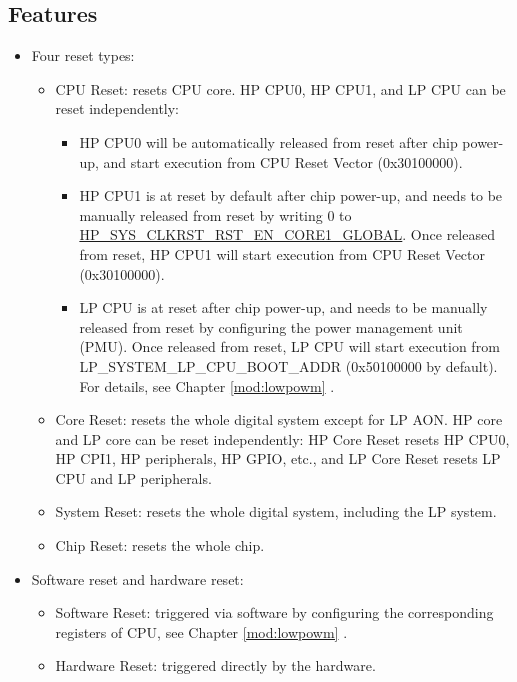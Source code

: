\documentclass[main\_\_EN.tex]{subfiles}
\begin{document}
\subsection{Features}
\label{sec:resclk-features}
\begin{itemize}
    \item Four reset types:
    \begin{itemize}
    \item CPU Reset: resets CPU core. HP CPU0, HP CPU1, and LP CPU can be reset independently:
    \begin{itemize}
            \item HP CPU0 will be automatically released from reset after chip power-up, and start execution from CPU Reset Vector (0x30100000).
            \item HP CPU1 is at reset by default after chip power-up, and needs to be manually released from reset by writing 0 to \hyperref[fielddesc:HPSYSCLKRSTRSTENCORE1GLOBAL]{HP\_SYS\_CLKRST\_RST\_EN\_CORE1\_GLOBAL}. Once released from reset, HP CPU1 will start execution from CPU Reset Vector (0x30100000).
            \item LP CPU is at reset after chip power-up, and needs to be manually released from reset by configuring the power management unit (PMU). Once released from reset, LP CPU will start execution from LP\_SYSTEM\_LP\_CPU\_BOOT\_ADDR (0x50100000 by default). For details, see Chapter \ref{mod:lowpowm} \textit{}.
    \end{itemize}
    \item Core Reset: resets the whole digital system except for LP AON. HP core and LP core can be reset independently: HP Core Reset resets HP CPU0, HP CPI1, HP peripherals, HP GPIO, etc., and LP Core Reset resets LP CPU and LP peripherals.
    \item System Reset: resets the whole digital system, including the LP system.
    \item Chip Reset: resets the whole chip.
    \end{itemize}
    \item Software reset and hardware reset:
    \begin{itemize}
        \item Software Reset: triggered via software by configuring the corresponding registers of CPU, see Chapter \ref{mod:lowpowm} \textit{}.
        \item Hardware Reset: triggered directly by the hardware.
    \end{itemize}
\end{itemize}
\end{document}
